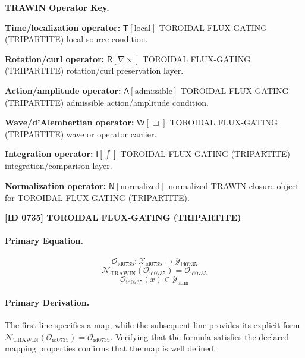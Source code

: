 \par\vspace{0.45\baselineskip}
\noindent\begin{minipage}[t]{\linewidth}
\begingroup
\small
\raggedright
\textbf{TRAWIN Operator Key.}\par
\noindent\textbf{Time/localization operator:} $\mathsf{T}\!\left[\mathrm{local}\right]$ TOROIDAL FLUX-GATING (TRIPARTITE) local source condition.\par
\noindent\textbf{Rotation/curl operator:} $\mathsf{R}\!\left[\nabla\times\right]$ TOROIDAL FLUX-GATING (TRIPARTITE) rotation/curl preservation layer.\par
\noindent\textbf{Action/amplitude operator:} $\mathsf{A}\!\left[\mathrm{admissible}\right]$ TOROIDAL FLUX-GATING (TRIPARTITE) admissible action/amplitude condition.\par
\noindent\textbf{Wave/d'Alembertian operator:} $\mathsf{W}\!\left[\Box\right]$ TOROIDAL FLUX-GATING (TRIPARTITE) wave or operator carrier.\par
\noindent\textbf{Integration operator:} $\mathsf{I}\!\left[\int\right]$ TOROIDAL FLUX-GATING (TRIPARTITE) integration/comparison layer.\par
\noindent\textbf{Normalization operator:} $\mathsf{N}\!\left[\mathrm{normalized}\right]$ normalized TRAWIN closure object for TOROIDAL FLUX-GATING (TRIPARTITE).\par
\endgroup
\end{minipage}

\clearpage
\noindent\textbf{[ID 0735] TOROIDAL FLUX-GATING (TRIPARTITE)}\par
\vspace{0.35em}
\paragraph{Primary Equation.}
\[
\mathcal{O}_{\mathrm{id0735}}:\mathcal{X}_{\mathrm{id0735}}\longrightarrow\mathcal{Y}_{\mathrm{id0735}}
\]
\[
\mathcal{N}_{\mathrm{TRAWIN}}(\mathcal{O}_{\mathrm{id0735}})=\mathcal{O}_{\mathrm{id0735}}
\]
\[
\mathcal{O}_{\mathrm{id0735}}(x)\in\mathcal{Y}_{\mathrm{adm}}
\]

\paragraph{Primary Derivation.}
The first line specifies a map, while the subsequent line provides its explicit form \( \mathcal{N}_{\mathrm{TRAWIN}}(\mathcal{O}_{\mathrm{id0735}})=\mathcal{O}_{\mathrm{id0735}} \). Verifying that the formula satisfies the declared mapping properties confirms that the map is well defined.
